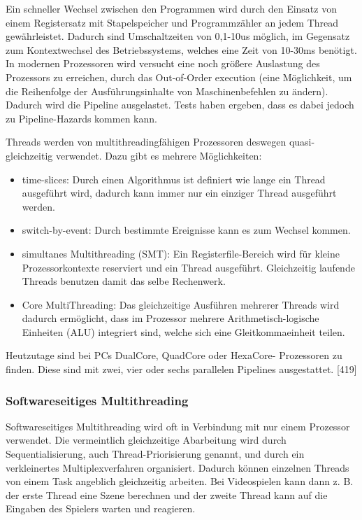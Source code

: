 \documentclass[12pt,a4paper]{report}
\begin{document}
\begin{onehalfspace}
Ein schneller Wechsel zwischen den Programmen wird durch den Einsatz von einem Registersatz mit Stapelspeicher und Programmzähler an jedem Thread gewährleistet. Dadurch sind Umschaltzeiten von 0,1-10us möglich, im Gegensatz zum Kontextwechsel des Betriebssystems, welches eine Zeit von 10-30ms benötigt.\\

In modernen Prozessoren wird versucht eine noch größere Auslastung des Prozessors zu erreichen, durch das Out-of-Order execution (eine Möglichkeit, um die Reihenfolge der Ausführungsinhalte von Maschinenbefehlen zu ändern). Dadurch wird die Pipeline ausgelastet. Tests haben ergeben, dass es dabei jedoch zu Pipeline-Hazards kommen kann.

Threads werden von multithreadingfähigen Prozessoren deswegen quasi-gleichzeitig verwendet. Dazu gibt es mehrere Möglichkeiten:
\begin{itemize}
\item time-slices: Durch einen Algorithmus ist definiert wie lange ein Thread ausgeführt wird, dadurch kann immer nur ein einziger Thread ausgeführt werden.
\item switch-by-event: Durch bestimmte Ereignisse kann es zum Wechsel kommen.
\item simultanes Multithreading (SMT): Ein Registerfile-Bereich wird für kleine Prozessorkontexte reserviert und ein Thread ausgeführt. Gleichzeitig laufende Threads benutzen damit das selbe Rechenwerk.
\item Core MultiThreading: Das gleichzeitige Ausführen mehrerer Threads wird dadurch ermöglicht, dass im Prozessor mehrere Arithmetisch-logische Einheiten (ALU) integriert sind, welche sich eine Gleitkommaeinheit teilen.
\end{itemize}
Heutzutage sind bei PCs DualCore, QuadCore oder HexaCore- Prozessoren zu finden. Diese sind mit zwei, vier oder sechs parallelen Pipelines ausgestattet. [419]


\subsubsection{Softwareseitiges Multithreading}
Softwareseitiges Multithreading wird oft in Verbindung mit nur einem Prozessor verwendet. Die vermeintlich gleichzeitige Abarbeitung wird durch Sequentialisierung, auch Thread-Priorisierung genannt, und durch ein verkleinertes Multiplexverfahren organisiert. Dadurch können einzelnen Threads von einem Task angeblich gleichzeitig arbeiten. Bei Videospielen kann dann z. B. der erste Thread eine Szene berechnen und der zweite Thread kann auf die Eingaben des Spielers warten und reagieren.\\


\end{onehalfspace}
\end{document}
